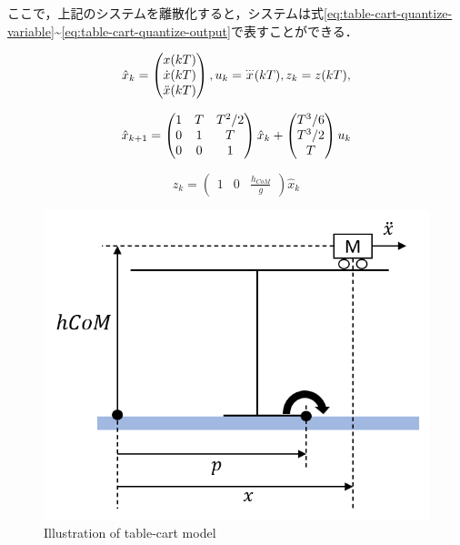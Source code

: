 \newpage

ここで，上記のシステムを離散化すると，システムは式\eqref{eq:table-cart-quantize-variable}\textasciitilde\eqref{eq:table-cart-quantize-output}で表すことができる．


\begin{equation}
  \hat{x}_{k}=
  \begin{pmatrix}
    x(kT)\cr \dot{x}(kT)\cr\ddot{x}(kT)
  \end{pmatrix}
  ,
  u_{k}
    =
    {\buildrel\ldots\over{x}}(kT)
  , z_{k}=z(kT),
  \label{eq:table-cart-quantize-variable}
\end{equation}

\begin{equation}
  \hat{x}_{k+1}=
  \begin{pmatrix}
    1 & T & T^{2}/2\cr 0 & 1 & T\cr 0 & 0 & 1
  \end{pmatrix}
  \hat{x}_{k} +
  \begin{pmatrix}
    T^{3}/6 \\  T^{3}/2 \\ T
  \end{pmatrix}
  u_{k}
  \label{eq:table-cart-quantize-state}
\end{equation}

\begin{equation}
  z_{k} =
  \begin{pmatrix}
    1 & 0 & \frac{h_{CoM}}{g}
  \end{pmatrix}
  \hat{x}_{k}
  \label{eq:table-cart-quantize-output}
\end{equation}

\begin{figure}[hbtp]
  \centering
  \includegraphics[keepaspectratio, scale=0.6]
  {images/table_cart_hcom.png}
  \caption{Illustration of table-cart model }
  \label{Fig:tablecart}
\end{figure}




